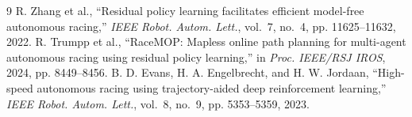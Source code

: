 \documentclass[conference]{IEEEtran}
\begin{document}
\begin{thebibliography}{9}
 R. Zhang et al., ``Residual policy learning facilitates efficient model-free autonomous
racing,'' \emph{IEEE Robot. Autom. Lett.}, vol.~7, no.~4, pp. 11625--11632, 2022.
 R. Trumpp et al., ``RaceMOP: Mapless online path planning for multi-agent autonomous racing
using residual policy learning,'' in \emph{Proc. IEEE/RSJ IROS}, 2024, pp. 8449--8456.
 B. D. Evans, H. A. Engelbrecht, and H. W. Jordaan, ``High-speed autonomous racing using
trajectory-aided deep reinforcement learning,'' \emph{IEEE Robot. Autom. Lett.}, vol.~8, no.~9, pp. 5353--5359,
2023.
\end{thebibliography}
\end{document}
